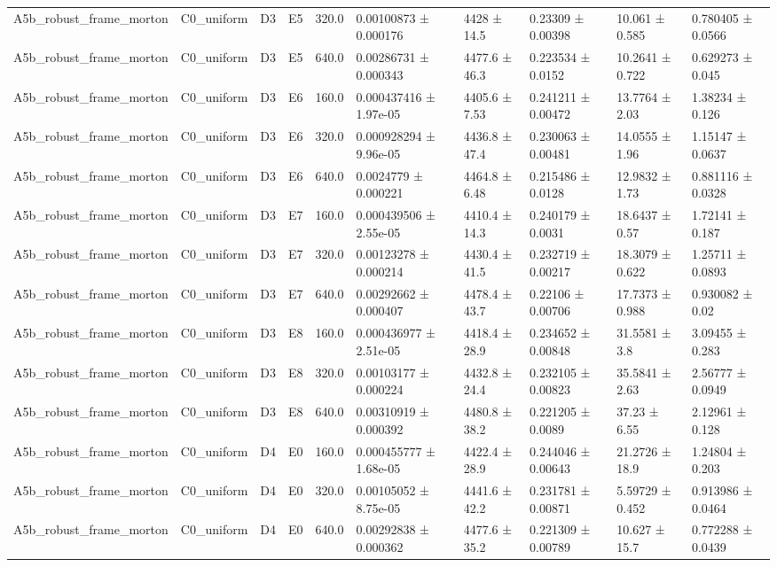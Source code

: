 \begin{table}
\begin{tabular}{llllllllll}
A5b\_robust\_frame\_morton & C0\_uniform & D3 & E5 & 320.0 & 0.00100873 ± 0.000176 & 4428 ± 14.5 & 0.23309 ± 0.00398 & 10.061 ± 0.585 & 0.780405 ± 0.0566 \\
A5b\_robust\_frame\_morton & C0\_uniform & D3 & E5 & 640.0 & 0.00286731 ± 0.000343 & 4477.6 ± 46.3 & 0.223534 ± 0.0152 & 10.2641 ± 0.722 & 0.629273 ± 0.045 \\
A5b\_robust\_frame\_morton & C0\_uniform & D3 & E6 & 160.0 & 0.000437416 ± 1.97e-05 & 4405.6 ± 7.53 & 0.241211 ± 0.00472 & 13.7764 ± 2.03 & 1.38234 ± 0.126 \\
A5b\_robust\_frame\_morton & C0\_uniform & D3 & E6 & 320.0 & 0.000928294 ± 9.96e-05 & 4436.8 ± 47.4 & 0.230063 ± 0.00481 & 14.0555 ± 1.96 & 1.15147 ± 0.0637 \\
A5b\_robust\_frame\_morton & C0\_uniform & D3 & E6 & 640.0 & 0.0024779 ± 0.000221 & 4464.8 ± 6.48 & 0.215486 ± 0.0128 & 12.9832 ± 1.73 & 0.881116 ± 0.0328 \\
A5b\_robust\_frame\_morton & C0\_uniform & D3 & E7 & 160.0 & 0.000439506 ± 2.55e-05 & 4410.4 ± 14.3 & 0.240179 ± 0.0031 & 18.6437 ± 0.57 & 1.72141 ± 0.187 \\
A5b\_robust\_frame\_morton & C0\_uniform & D3 & E7 & 320.0 & 0.00123278 ± 0.000214 & 4430.4 ± 41.5 & 0.232719 ± 0.00217 & 18.3079 ± 0.622 & 1.25711 ± 0.0893 \\
A5b\_robust\_frame\_morton & C0\_uniform & D3 & E7 & 640.0 & 0.00292662 ± 0.000407 & 4478.4 ± 43.7 & 0.22106 ± 0.00706 & 17.7373 ± 0.988 & 0.930082 ± 0.02 \\
A5b\_robust\_frame\_morton & C0\_uniform & D3 & E8 & 160.0 & 0.000436977 ± 2.51e-05 & 4418.4 ± 28.9 & 0.234652 ± 0.00848 & 31.5581 ± 3.8 & 3.09455 ± 0.283 \\
A5b\_robust\_frame\_morton & C0\_uniform & D3 & E8 & 320.0 & 0.00103177 ± 0.000224 & 4432.8 ± 24.4 & 0.232105 ± 0.00823 & 35.5841 ± 2.63 & 2.56777 ± 0.0949 \\
A5b\_robust\_frame\_morton & C0\_uniform & D3 & E8 & 640.0 & 0.00310919 ± 0.000392 & 4480.8 ± 38.2 & 0.221205 ± 0.0089 & 37.23 ± 6.55 & 2.12961 ± 0.128 \\
A5b\_robust\_frame\_morton & C0\_uniform & D4 & E0 & 160.0 & 0.000455777 ± 1.68e-05 & 4422.4 ± 28.9 & 0.244046 ± 0.00643 & 21.2726 ± 18.9 & 1.24804 ± 0.203 \\
A5b\_robust\_frame\_morton & C0\_uniform & D4 & E0 & 320.0 & 0.00105052 ± 8.75e-05 & 4441.6 ± 42.2 & 0.231781 ± 0.00871 & 5.59729 ± 0.452 & 0.913986 ± 0.0464 \\
A5b\_robust\_frame\_morton & C0\_uniform & D4 & E0 & 640.0 & 0.00292838 ± 0.000362 & 4477.6 ± 35.2 & 0.221309 ± 0.00789 & 10.627 ± 15.7 & 0.772288 ± 0.0439 \\

\end{tabular}
\end{table}
